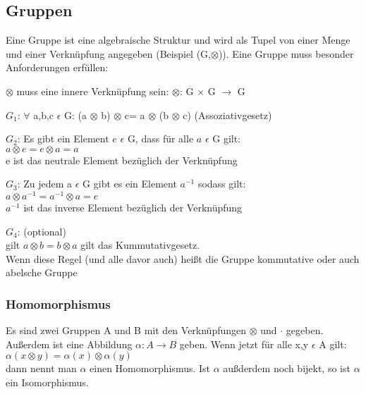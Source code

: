 \documentclass[a4paper,10pt]{scrartcl}
\begin{document}
        \subsection{Gruppen}
            Eine Gruppe ist eine algebraische Struktur und wird als Tupel von einer Menge und einer Verknüpfung angegeben (Beispiel (G,$\otimes$)). Eine Gruppe muss 
            besonder Anforderungen erfüllen: 
            \begin{description}
                \item $\otimes$ muss eine innere Verknüpfung sein: $\otimes$: G $\times$ G $\rightarrow$ G 
                \item $G_1$: $\forall$ a,b,c $\epsilon$ G: (a $\otimes$ b) $\otimes$ c= a $\otimes$ (b $\otimes$ c) (Assoziativgesetz)
                \item $G_2$: Es gibt ein Element $e$ $\epsilon$ G, dass für alle $a$ $\epsilon$ G gilt:\\ $a \otimes e = e \otimes a = a$ \\ e ist das neutrale Element bezüglich der Verknüpfung
                \item $G_3$: Zu jedem a $\epsilon$ G gibt es ein Element $a^{-1}$ sodass gilt: \\ $a \otimes a^{-1} = a^{-1} \otimes a = e$ \\ $a^{-1}$ ist das inverse Element bezüglich der Verknüpfung
                \item $G_4$: (optional) \\ gilt $a \otimes b = b \otimes a$ gilt das Kummutativgesetz. \\Wenn diese Regel (und alle davor auch) heißt die Gruppe kommutative oder auch abelsche Gruppe
            \end{description}
            \subsubsection{Homomorphismus}
                Es sind zwei Gruppen A und B mit den Verknüpfungen $\otimes$ und $\cdot$ gegeben. \\
                Außerdem ist eine Abbildung $\alpha: A \rightarrow B$ geben. Wenn jetzt für alle x,y $\epsilon$ A gilt:\\
                $\alpha(x \otimes y) = \alpha(x) \otimes \alpha(y)$\\
                dann nennt man $\alpha$ einen Homomorphismus. Ist $\alpha$ außderdem noch bijekt, so ist $\alpha$ ein Isomorphismus.  
\end{document}
